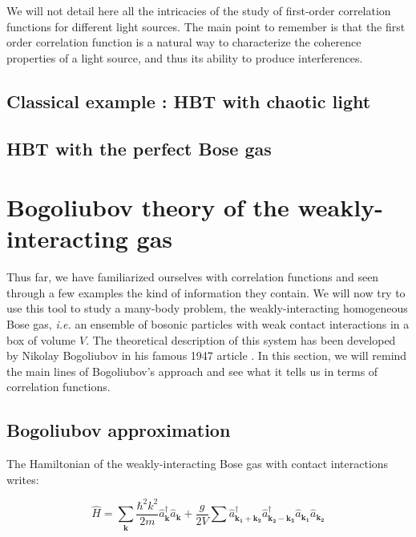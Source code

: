 We will not detail here all the intricacies of the study of first-order correlation functions for different light sources. The main point to remember is that the first order correlation function is a natural way to characterize the coherence properties of a light source, and thus its ability to produce interferences. 





\subsection{Classical example : HBT with chaotic light}

\subsection{HBT with the perfect Bose gas}

\section{Bogoliubov theory of the weakly-interacting gas}

Thus far, we have familiarized ourselves with correlation functions and seen through a few examples the kind of information they contain. We will now try to use this tool to study a many-body problem, the weakly-interacting homogeneous Bose gas, {\it i.e.} an ensemble of bosonic particles with weak contact interactions in a box of volume $V$. The theoretical description of this system has been developed by Nikolay Bogoliubov in his famous 1947 article \cite{bogoliubov1947}. In this section, we will remind the main lines of Bogoliubov's approach and see what it tells us in terms of correlation functions.

\subsection{Bogoliubov approximation}


The Hamiltonian of the weakly-interacting Bose gas with contact interactions writes:

\begin{equation}
    \hat{H}=\sum_{\bm{k}}\frac{\hbar^2 k^2}{2m} \hat{a}^{\dagger}_{\bm{k}}  \hat{a}_{\bm{k}} +  \frac{g}{2V} \sum \hat{a}^{\dagger}_{\bm{k_1}+\bm{k_3}} \hat{a}^{\dagger}_{\bm{k_2}-\bm{k_3}} \hat{a}_{\bm{k_1}} \hat{a}_{\bm{k_2}} 
\end{equation}

